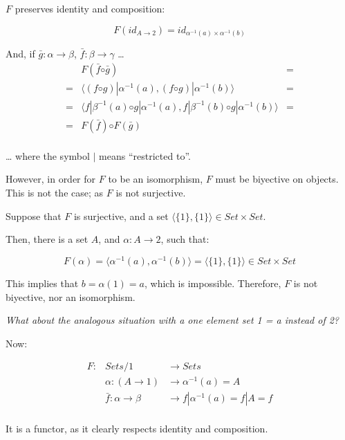 \documentclass{article}
\begin{document}
\begin{enumerate}
    $F$ preserves identity and composition:

    $$F(id_{A→2}) = id_{α^{-1}(a)×α^{-1}(b)}$$

    And, if $\bar{g} : α → β$, $\bar{f} : β → γ$ …
    \begin{equation*}
    \begin{array}{rcl}
       & F(\bar{f} ◦ \bar{g})                        & = \\
    =  & \langle (f ◦ g)|α^{-1}(a), (f ◦ g)|α^{-1}(b) \rangle        & = \\
    =  & \langle f|β^{-1}(a) ◦ g|α^{-1}(a), f|β^{-1}(b) ◦ g|α^{-1}(b) \rangle & = \\
    =  & F(\bar{f}) ◦ F(\bar{g}) & \\ 
    \end{array}
    \end{equation*}

    … where the symbol $|$ means “restricted to”.
    
    However, in order for $F$ to be an isomorphism, $F$ must be biyective
    on objects. This is not the case; as $F$ is not
    surjective.

    Suppose that $F$ is surjective, and a set $\langle \{1\}, \{1\} \rangle ∈ Set × Set$.

    Then, there is a set $A$, and $α : A → 2$, such that:

    $$F(α) = \langle α^{-1}(a), α^{-1}(b) \rangle = \langle \{1\}, \{1\} \rangle ∈ Set × Set$$

    This implies that $b = α(1) = a$, which is impossible. Therefore,
    $F$ is not biyective, nor an isomorphism.


    

   
{\em What about the analogous situation with a one element set 1 = {a} instead of 2?}

    Now:

    \begin{equation*}
    \begin{array}{rll}
      F : & Sets/1           & → Sets                   \\
          & α : (A → 1)      & → α^{-1}(a)   = A         \\
          & \bar{f} : α → β  & → f|α^{-1}(a) = f|A  = f  \\
    \end{array}
    \end{equation*}

    It is a functor, as it clearly respects identity and composition.


\end{enumerate}
\end{document}

